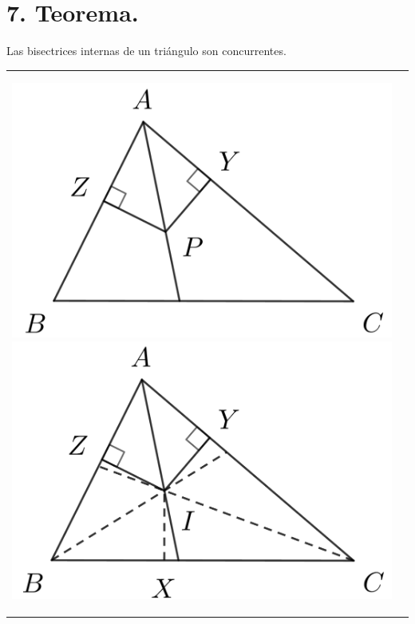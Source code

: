 \documentclass[12pt,a4paper, oneside]{book}
\begin{document}
\section{7. Teorema.}
Las bisectrices internas de un triángulo son concurrentes.
\\
\begin{tabular}{p{15.9cm}p{1cm}}
\\
\begin{center}
\includegraphics[scale=0.5]{Imagenes/bisectriz.png} 
\includegraphics[scale=0.5]{Imagenes/bisectriz1.png} 
\end{center}
\end{tabular}
\\
\end{document}
